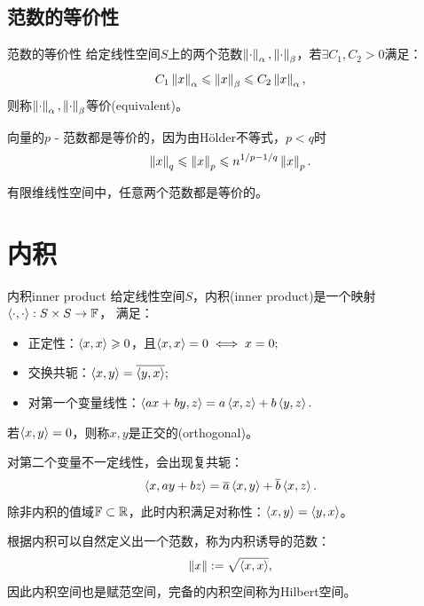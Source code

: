 \subsection{范数的等价性}

\begin{definition}
    {范数的等价性}{}
    给定线性空间$S$上的两个范数$\left\lVert\cdot\right\rVert_\alpha,\left\lVert\cdot\right\rVert_\beta$，若$\exists C_1,C_2>0$满足：
    \[
        C_1\left\lVert x\right\rVert_\alpha\leqslant\left\lVert x\right\rVert_\beta\leqslant C_2\left\lVert x\right\rVert_\alpha,
    \]
    则称$\left\lVert\cdot\right\rVert_\alpha,\left\lVert\cdot\right\rVert_\beta$等价(equivalent)。
\end{definition}

\begin{corollary}
    向量的$p$ - 范数都是等价的，因为由H\"older不等式，$p<q$时
    \begin{equation}
        \left\lVert x\right\rVert_q\leqslant\left\lVert x\right\rVert_p\leqslant n^{1/p-1/q}\left\lVert x\right\rVert_p.
    \end{equation}
\end{corollary}

\begin{theorem}
    {}{}
    有限维线性空间中，任意两个范数都是等价的。
\end{theorem}


\section{内积}
\label{sec:inner product}

\begin{definition}
    {内积}{inner product}
    给定线性空间$S$，内积(inner product)是一个映射$\left\langle \cdot,\cdot\right\rangle:S\times S\to\mathbb F$，
    满足：
    \begin{itemize}
        \item 正定性：$\left\langle x,x\right\rangle\geqslant 0$，且$\left\langle x,x\right\rangle=0\iff x=0;$
        \item 交换共轭：$\left\langle x,y\right\rangle=\overline{\left\langle y,x\right\rangle};$
        \item 对第一个变量线性：$\left\langle ax+by,z\right\rangle=a\left\langle x,z\right\rangle+b\left\langle y,z\right\rangle.$
    \end{itemize}
    若$\left\langle x,y\right\rangle=0$，则称$x,y$是正交的(orthogonal)。
\end{definition}

\begin{remark}
    对第二个变量不一定线性，会出现复共轭：
    \[
        \left\langle x,ay+bz\right\rangle=\overline a\left\langle x,y\right\rangle+\overline b\left\langle x,z\right\rangle.
    \]
    除非内积的值域$\mathbb F\subset\mathbb R$，此时内积满足对称性：$\left\langle x,y\right\rangle=\left\langle y,x\right\rangle$。
\end{remark}

\begin{corollary}
    根据内积可以自然定义出一个范数，称为内积诱导的范数：
    \begin{equation}
        \left\lVert x\right\rVert:=\sqrt{\left\langle x,x\right\rangle},
    \end{equation}
    因此内积空间也是赋范空间，完备的内积空间称为Hilbert空间。
\end{corollary}

